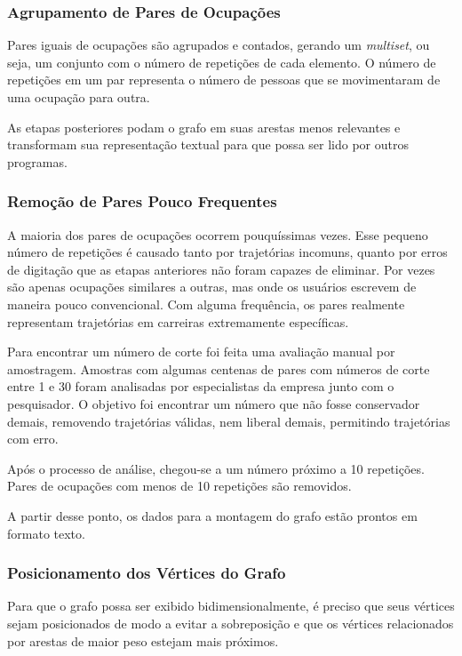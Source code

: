 \documentclass[12pt,a4paper]{article}
\begin{document}
\subsubsection{Agrupamento de Pares de Ocupações}

Pares iguais de ocupações são agrupados e contados, gerando um \textit{multiset}, ou seja, um conjunto com o número de repetições de cada elemento. O número de repetições em um par representa o número de pessoas que se movimentaram de uma ocupação para outra.

As etapas posteriores podam o grafo em suas arestas menos relevantes e transformam sua representação textual para que possa ser lido por outros programas.

\subsubsection{Remoção de Pares Pouco Frequentes} \label{sec:grafo-final}

A maioria dos pares de ocupações ocorrem pouquíssimas vezes.  Esse pequeno número de repetições é causado tanto por trajetórias incomuns, quanto por erros de digitação que as etapas anteriores não foram capazes de eliminar. Por vezes são apenas ocupações similares a outras, mas onde os usuários escrevem de maneira pouco convencional. Com alguma frequência, os pares realmente representam trajetórias em carreiras extremamente específicas.

Para encontrar um número de corte foi feita uma avaliação manual por amostragem. Amostras com algumas centenas de pares com números de corte entre 1 e 30 foram analisadas por especialistas da empresa junto com o pesquisador. O objetivo foi encontrar um número que não fosse conservador demais, removendo trajetórias válidas, nem liberal demais, permitindo trajetórias com erro.

Após o processo de análise, chegou-se a um número próximo a 10 repetições. Pares de ocupações com menos de 10 repetições são removidos.

A partir desse ponto, os dados para a montagem do grafo estão prontos em formato texto.

\subsubsection{Posicionamento dos Vértices do Grafo}

Para que o grafo possa ser exibido bidimensionalmente, é preciso que seus vértices sejam posicionados de modo a evitar a sobreposição e que os vértices relacionados por arestas de maior peso estejam mais próximos.
\end{document}
